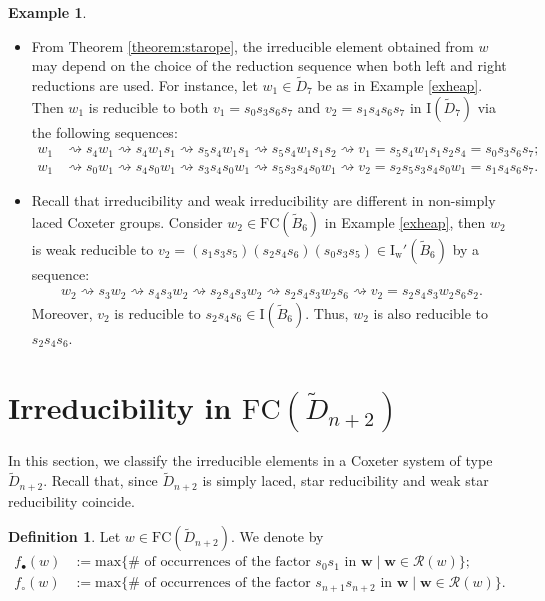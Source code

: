 \documentclass{amsart}
\newcommand{\D}{{\widetilde{D}_{n+2}}}
\newcommand{\fc}{{\mathrm{FC}}}
\newcommand{\IRc}{\mathrm{I_w'}}
\newcommand{\I}{\mathrm{I}}
\newcommand{\red}{\rightsquigarrow}
\theoremstyle{definition}
\newtheorem{Definition}[Theorem]{Definition}
\newtheorem{Example}[Theorem]{Example}
\begin{document}
\begin{Example}\
\begin{itemize}
    \item[(1)] From Theorem \ref{theorem:starope}, the irreducible element obtained from $w$ may depend on the choice of the reduction sequence when both left and right reductions are used. For instance, let $w_1\in \widetilde{D}_{7}$ be as in Example \ref{exheap}. Then $w_1$ is reducible to both  $v_1=s_0s_3s_6s_{7}$ and $v_2=s_1s_4s_6s_7$ in $\I(\widetilde{D}_{7})$ via the following sequences:
\begin{align*}
    w_1&\red s_4w_1\red s_4w_1s_1 \red s_5s_4w_1s_1 \red s_5s_4w_1s_1s_2 \red v_1=s_5s_4w_1s_1s_2s_4=s_0s_3s_6s_{7};\\
     w_1&\red s_0w_1\red s_4s_0w_1 \red s_3s_4s_0w_1 \red s_5s_3s_4s_0w_1 \red v_2=s_2s_5s_3s_4s_0w_1=s_1s_4s_6s_7.     
\end{align*} 

\item[(2)] Recall that irreducibility and weak irreducibility are different in non-simply laced Coxeter groups. Consider $w_2\in \fc(\widetilde{B}_{6})$ in Example \ref{exheap}, then $w_2$ is weak reducible to $v_2=(s_1s_3s_5)(s_2s_4s_6)(s_0s_3s_5) \in \IRc(\widetilde{B}_{6})$ by a sequence:
\begin{align*}
    w_2\red s_3w_2\red s_4s_3w_2 \red s_2s_4s_3w_2 \red s_2s_4s_3w_2s_6 \red v_2=s_2s_4s_3w_2s_6s_2.
\end{align*}
Moreover, $v_2$ is reducible to $s_2s_4s_6\in \I(\widetilde{B}_6)$. Thus, $w_2$ is also reducible to $s_2s_4s_6$. 
\end{itemize}
\end{Example}


\section{Irreducibility in $\fc(\D)$} \label{se2} 

In this section, we classify the irreducible elements in a Coxeter system of type $\D$. Recall that, since $\D$ is simply laced, star reducibility and weak star reducibility coincide.

\begin{Definition}
\label{occorrenze}
Let $w \in \fc(\D)$. We denote by
\begin{align*}
f_\bullet(w)&:=\text{max$\{\#$ of occurrences of the factor $s_0s_1$ in $\mathbf{w} \mid  \mathbf{w} \in \mathcal{R}(w)\};$}\\
f_\circ(w)&:=\text{max$\{\#$ of occurrences of the factor $s_{n+1}s_{n+2}$ in $\mathbf{w} \mid  \mathbf{w} \in \mathcal{R}(w)\}.$}
\end{align*}
\end{Definition}
\end{document}

